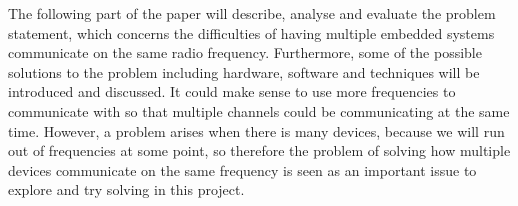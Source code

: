 \newpage
The following part of the paper will describe, analyse and evaluate the problem statement, which concerns the difficulties of having multiple embedded systems communicate on the same radio frequency.
Furthermore, some of the possible solutions to the problem including hardware, software and techniques will be introduced and discussed.
It could make sense to use more frequencies to communicate with so that multiple channels could be communicating at the same time.
However, a problem arises when there is many devices, because we will run out of frequencies at some point, so therefore the problem of solving how multiple devices communicate on the same frequency is seen as an important issue to explore and try solving in this project.
